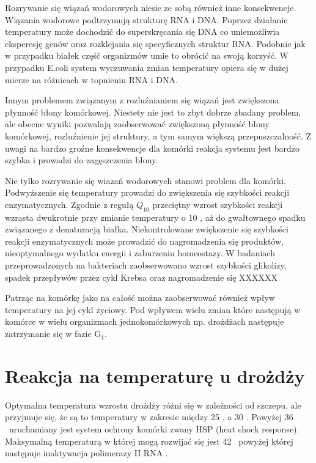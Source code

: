 \documentclass{pracamgr}
\begin{document}
Rozrywanie się wiązań wodorowych niesie ze sobą również inne konsekwencje. Wiązania wodorowe podtrzymują strukturę RNA i DNA. Poprzez działanie temperatury może dochodzić do superskręcania się DNA co uniemożliwia 
eksperesję genów oraz rozklejania się specyficznych struktur RNA. Podobnie jak w przypadku białek część organizmów umie to obrócić na swoją korzyść. W przypadku E.coli system wyczuwania zmian temperatury opiera się
w dużej mierze na różnicach w topnieniu RNA i DNA\cite{TsInEubact, Digel08}.

Innym problemem związanym z rozluźnianiem się wiązań jest zwiększona płynność błony komórkowej. Niestety nie jest to zbyt dobrze zbadany problem\cite{Membranefluidity}, ale obecne wyniki pozwalają zaobserwować zwiększoną
płynność błony komórkowej, rozluźnienie jej struktury, a tym samym większą przepuszczalność. Z uwagi na bardzo groźne konsekwencje dla komórki reakcja systemu jest bardzo szybka i prowadzi do zagęszczenia błony.

Nie tylko rozrywanie się wiazań wodorowych stanowi problem dla komórki. Podwyższenie się temperatury prowadzi do zwiększenia się szybkości reakcji enzymatycznych. Zgodnie z regułą $Q_{10}$ przeciętny wzrost
szybkości reakcji wzrasta dwukrotnie przy zmianie temperatury o 10 \textcelsius, aż do gwałtownego spadku związanego z denaturacją białka\cite{}. Niekontrolowane zwiększenie się szybkości reakcji enzymatycznych
może prowadzić do nagromadzenia się produktów, nieoptymalnego wydatku energii i zaburzeniu homeostazy. W badaniach przeprowadzonych na bakteriach zaobserwowano wzrost szybkości glikolizy, spadek przepływów przez 
cykl Krebsa oraz nagromadzenie się XXXXXX \cite{Wittmann07}

Patrząc na komórkę jako na całość można zaobserwować również wpływ temperatury na jej cykl życiowy. Pod wpływem wielu zmian które następują w komórce w wielu organizmach jednokomórkowych np. drożdżach 
następuje zatrzymanie się w fazie G$_1$.

\section{Reakcja na temperaturę u drożdży}

Optymalna temperatura wzrostu drożdży różni się w zależności od szczepu, ale przyjmuje się, że są to temperatury w 
zakresie między 25 \textcelsius, a 30 \textcelsius. Powyżej 36 \textcelsius\ uruchamiany jest system ochrony komórki
zwany HSP (heat shock response). Maksymalną temperaturą  w której mogą rozwijać się jest 42 \textcelsius\ powyżej której 
następuje inaktywacja polimerazy II RNA \cite{Morano12}.
\end{document}
